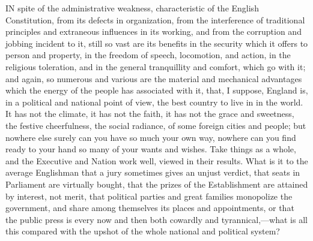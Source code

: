 IN
spite of the administrative weakness, characteristic of the English
Constitution, from its defects in organization, from the interference
of traditional principles and extraneous influences in its working,
and from the corruption and jobbing incident to it, still so vast are
its benefits in the security which it offers to person and property,
in the freedom of speech, locomotion, and action, in the religious
toleration, and in the general tranquillity and comfort, which go with
it; and again, so numerous and various are the material and mechanical
advantages which the energy of the people has associated with it,
that, I suppose, England is, in a political and national point of
view, the best country to live in in the world. It has not the
climate, it has not the faith, it has not the grace and sweetness, the
festive cheerfulness, the social radiance, of some foreign cities and
people; but nowhere else surely can you have so much your own way,
nowhere can you find ready to your hand so many of your wants and
wishes. Take things as a whole, and the Executive and Nation work
well, viewed in their results. What is it to the average Englishman
that a jury sometimes gives an unjust verdict, that seats in
Parliament are virtually bought, that the prizes of the Establishment
are attained by interest, not merit, that political parties and great
families monopolize the government, and share among themselves its
places and appointments, or that the public press is every now
and then both cowardly and tyrannical,—what is all this compared
with the upshot of the whole national and political system?

